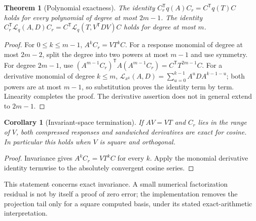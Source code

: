 \documentclass[10pt,letterpaper,twoside]{article}
\newcommand{\Lfrechet}{\mathcal{L}}
\newtheorem{theorem}{Theorem}
\newtheorem{corollary}{Corollary}
\begin{document}
\begin{theorem}[Polynomial exactness]
The identity $C_r^{\mathsf T}q(A)C_r=C^{\mathsf T}q(T)C$ holds for every
polynomial of degree at most $2m-1$. The identity
$C_r^{\mathsf T}\Lfrechet_q(A,D)C_r
=C^{\mathsf T}\Lfrechet_q(T,V^{\mathsf T}DV)C$ holds for degree at most $m$.
\end{theorem}
\begin{proof}
For $0\le k\le m-1$, $A^kC_r=VT^kC$. For a response monomial of degree
at most $2m-2$, split the degree into two powers at most $m-1$ and use symmetry.
For degree $2m-1$, use
$(A^{m-1}C_r)^{\mathsf T}A(A^{m-1}C_r)=C^{\mathsf T}T^{2m-1}C$.
For a derivative monomial of degree $k\le m$,
$\Lfrechet_{x^k}(A,D)=\sum_{u=0}^{k-1}A^uDA^{k-1-u}$; both powers are at
most $m-1$, so substitution proves the identity term by term. Linearity
completes the proof. The derivative assertion does not in general extend to
$2m-1$.
\end{proof}

\begin{corollary}[Invariant-space termination]
If $AV=VT$ and $C_r$ lies in the range of $V$, both compressed responses and
sandwiched derivatives are exact for cosine. In particular this holds when
$V$ is square and orthogonal.
\end{corollary}
\begin{proof}
Invariance gives $A^kC_r=VT^kC$ for every $k$. Apply the monomial derivative
identity termwise to the absolutely convergent cosine series.
\end{proof}
This statement concerns exact invariance. A small numerical factorization
residual is not by itself a proof of zero error; the implementation removes
the projection tail only for a square computed basis, under its stated
exact-arithmetic interpretation.
\end{document}
